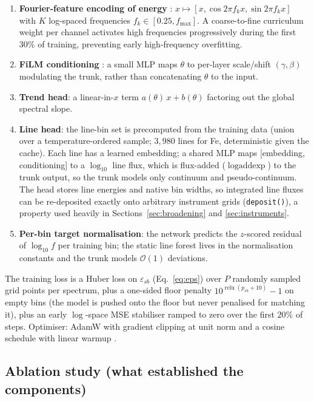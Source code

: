 \documentclass[11pt,a4paper]{article}
\newcommand{\code}[1]{\texttt{#1}}
\begin{document}
\begin{enumerate}
\item \textbf{Fourier-feature encoding of energy}
      \citep{tancik20}: $x \mapsto [x, \cos 2\pi f_k x, \sin 2\pi f_k x]$
      with $K$ log-spaced frequencies $f_k \in [0.25, f_{\max}]$. A
      coarse-to-fine curriculum weight per channel activates high
      frequencies progressively during the first
      $30\%$ of training, preventing early high-frequency overfitting.
\item \textbf{FiLM conditioning} \citep{perez18}: a small MLP maps
      $\theta$ to per-layer scale/shift $(\gamma,\beta)$ modulating the
      trunk, rather than concatenating $\theta$ to the input.
\item \textbf{Trend head}: a linear-in-$x$ term $a(\theta)\,x +
      b(\theta)$ factoring out the global spectral slope.
\item \textbf{Line head}: the line-bin set is precomputed from the
      training data (union over a temperature-ordered sample; $3{,}980$
      lines for Fe, deterministic given the cache). Each line has a
      learned embedding; a shared MLP maps [embedding, conditioning]
      to a $\log_{10}$ line flux, which is flux-added
      ($\operatorname{logaddexp}$) to the trunk output, so the trunk
      models only continuum and pseudo-continuum. The head stores line
      energies and native bin widths, so integrated line fluxes can be
      re-deposited exactly onto arbitrary instrument grids
      (\code{deposit()}), a property used heavily in
      Sections~\ref{sec:broadening} and \ref{sec:instruments}.
\item \textbf{Per-bin target normalisation}: the network predicts the
      $z$-scored residual of $\log_{10} f$ per training bin; the static
      line forest lives in the normalisation constants and the trunk
      models $\mathcal{O}(1)$ deviations.
\end{enumerate}

The training loss is a Huber loss on $\varepsilon_{sb}$
(Eq.~\ref{eq:eps}) over $P$ randomly sampled grid points per spectrum,
plus a one-sided floor penalty $10^{\operatorname{relu}(p_{sb}+10)}-1$
on empty bins (the model is pushed onto the floor but never penalised
for matching it), plus an early $\log$-space MSE stabiliser ramped to
zero over the first $20\%$ of steps. Optimiser: AdamW
\citep{loshchilov19} with gradient clipping at unit norm and a cosine
schedule with linear warmup \citep{loshchilov17}.

\subsection{Ablation study (what established the components)}
\label{sec:ablation}
\end{document}

